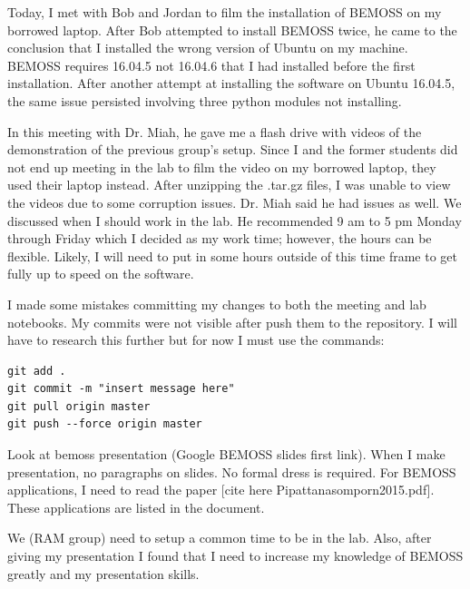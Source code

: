 \documentclass[fontsize=11pt, %
                             paper=letter, %
                             twoside, %
                             captions=tableheading,
                             index=totoc,
                             hyperref]{labbook}
\begin{document}
\begin{addmargin}[0cm]{0cm}
Today, I met with Bob and Jordan to film the installation of BEMOSS on my borrowed laptop. After Bob attempted to install BEMOSS twice, he came to the conclusion that I installed the wrong version of Ubuntu on my machine. BEMOSS requires 16.04.5 not 16.04.6 that I had installed before the first installation. After another attempt at installing the software on Ubuntu 16.04.5, the same issue persisted involving three python modules not installing.

In this meeting with Dr. Miah, he gave me a flash drive with videos of the demonstration of the previous group's setup. Since I and the former students did not end up meeting in the lab to film the video on my borrowed laptop, they used their laptop instead. After unzipping the .tar.gz files, I was unable to view the videos due to some corruption issues. Dr. Miah said he had issues as well. 
\bigbreak\noindent
We discussed when I should work in the lab. He recommended 9 am to 5 pm Monday through Friday which I decided as my work time; however, the hours can be flexible. Likely, I will need to put in some hours outside of this time frame to get fully up to speed on the software.  

I made some mistakes committing my changes to both the meeting and lab notebooks. My commits were not visible after push them to the repository. I will have to research this further but for now I must use the commands:
\begin{verbatim}
git add .
git commit -m "insert message here"
git pull origin master
git push --force origin master
\end{verbatim}

Look at bemoss presentation (Google BEMOSS slides first link). When I make presentation, no paragraphs on slides. No formal dress is required. 
\medbreak\noindent
For BEMOSS applications, I need to read the paper [cite here Pipattanasomporn2015.pdf]. These applications are listed in the document.

We (RAM group) need to setup a common time to be in the lab. Also, after giving my presentation I found that I need to increase my knowledge of BEMOSS greatly and my presentation skills.


\end{addmargin}
\end{document}
